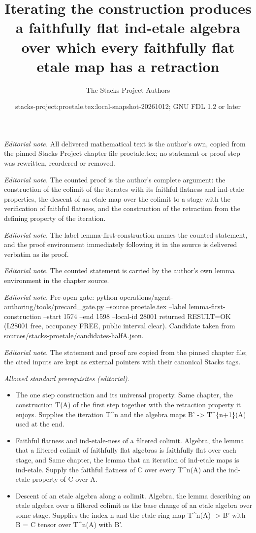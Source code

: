 \documentclass[10pt,a4paper]{amsart}
\title{Iterating the construction produces a faithfully flat ind-etale algebra over which every faithfully flat etale map has a retraction}
\author{The Stacks Project Authors}
\date{stacks-project:proetale.tex:local-snapshot-20261012; GNU FDL 1.2 or later}
\theoremstyle{plain}
\theoremstyle{definition}
\theoremstyle{remark}
\numberwithin{equation}{subsection}
\begin{document}
\maketitle
\noindent\textit{Editorial note.} All delivered mathematical text is the author's own, copied from the pinned Stacks Project chapter file proetale.tex; no statement or proof step was rewritten, reordered or removed.\par\medskip
\noindent\textit{Editorial note.} The counted proof is the author's complete argument: the construction of the colimit of the iterates with its faithful flatness and ind-etale properties, the descent of an etale map over the colimit to a stage with the verification of faithful flatness, and the construction of the retraction from the defining property of the iteration.\par\medskip
\noindent\textit{Editorial note.} The label lemma-first-construction names the counted statement, and the proof environment immediately following it in the source is delivered verbatim as its proof.\par\medskip
\noindent\textit{Editorial note.} The counted statement is carried by the author's own lemma environment in the chapter source.\par\medskip
\noindent\textit{Editorial note.} Pre-open gate: python operations/agent-authoring/tools/precard\_gate.py --source proetale.tex --label lemma-first-construction --start 1574 --end 1598 --local-id 28001 returned RESULT=OK (L28001 free, occupancy FREE, public interval clear). Candidate taken from sources/stacks-proetale/candidates-halfA.json.\par\medskip
\noindent\textit{Editorial note.} The statement and proof are copied from the pinned chapter file; the cited inputs are kept as external pointers with their canonical Stacks tags.\par\medskip
\noindent\textit{Allowed standard prerequisites (editorial).}\begin{itemize}
\item The one step construction and its universal property. Same chapter, the construction T(A) of the first step together with the retraction property it enjoys. Supplies the iteration T\textasciicircum{}n and the algebra maps B' -> T\textasciicircum{}\{n+1\}(A) used at the end.
\item Faithful flatness and ind-etale-ness of a filtered colimit. Algebra, the lemma that a filtered colimit of faithfully flat algebras is faithfully flat over each stage, and Same chapter, the lemma that an iteration of ind-etale maps is ind-etale. Supply the faithful flatness of C over every T\textasciicircum{}n(A) and the ind-etale property of C over A.
\item Descent of an etale algebra along a colimit. Algebra, the lemma describing an etale algebra over a filtered colimit as the base change of an etale algebra over some stage. Supplies the index n and the etale ring map T\textasciicircum{}n(A) -> B' with B = C tensor over T\textasciicircum{}n(A) with B'.
\end{itemize}\medskip
\end{document}
